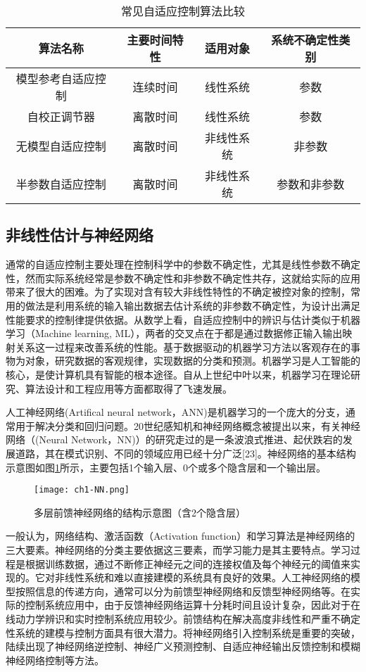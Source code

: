 \begin{table}
\centering
\caption{常见自适应控制算法比较}\label{tab:adaptive}
\begin{tabular*}{0.9\textwidth}{@{\extracolsep{\fill}}cccc}
\toprule
算法名称		&主要时间特性	&适用对象	&系统不确定性类别 \\
\midrule
模型参考自适应控制		&连续时间	&线性系统&参数\\
自校正调节器		&离散时间	& 线性系统&参数\\
无模型自适应控制		&离散时间	&非线性系统&非参数\\
半参数自适应控制		&离散时间&非线性系统	&参数和非参数\\
\bottomrule
\end{tabular*}
\end{table}

\subsection{非线性估计与神经网络}%

通常的自适应控制主要处理在控制科学中的参数不确定性，尤其是线性参数不确定性，然而实际系统经常是参数不确定性和非参数不确定性共存，这就给实际的应用带来了很大的困难。为了实现对含有较大非线性特性的不确定被控对象的控制，常用的做法是利用系统的输入输出数据去估计系统的非参数不确定性，为设计出满足性能要求的控制律提供依据。从数学上看，自适应控制中的辨识与估计类似于机器学习（Machine learning, ML），两者的交叉点在于都是通过数据修正输入输出映射关系这一过程来改善系统的性能。基于数据驱动的机器学习方法以客观存在的事物为对象，研究数据的客观规律，实现数据的分类和预测。机器学习是人工智能的核心，是使计算机具有智能的根本途径。自从上世纪中叶以来，机器学习在理论研究、算法设计和工程应用等方面都取得了飞速发展。

人工神经网络(Artifical neural network，ANN)是机器学习的一个庞大的分支，通常用于解决分类和回归问题。20世纪感知机和神经网络概念被提出以来，有关神经网络（(Neural Network，NN)）的研究走过的是一条波浪式推进、起伏跌宕的发展道路，其在模式识别、不同的领域应用已经十分广泛[23]。神经网络的基本结构示意图如图\ref{fig:MNN}所示，主要包括1个输入层、0个或多个隐含层和一个输出层。

\begin{figure}
 \centering
 \texttt{[image: ch1-NN.png]}
 \caption{多层前馈神经网络的结构示意图（含2个隐含层）}\label{fig:MNN}
\end{figure}

一般认为，网络结构、激活函数（Activation function）和学习算法是神经网络的三大要素。神经网络的分类主要依据这三要素，而学习能力是其主要特点。学习过程是根据训练数据，通过不断修正神经元之间的连接权值及每个神经元的阈值来实现的。它对非线性系统和难以直接建模的系统具有良好的效果。人工神经网络的模型按照信息的传递方向，通常可以分为前馈型神经网络和反馈型神经网络等。在实际的控制系统应用中，由于反馈神经网络运算十分耗时间且设计复杂，因此对于在线动力学辨识和实时控制系统应用较少。前馈结构在解决高度非线性和严重不确定性系统的建模与控制方面具有很大潜力。将神经网络引入控制系统是重要的突破，陆续出现了神经网络逆控制、神经广义预测控制、自适应神经输出反馈控制和模糊神经网络控制等方法。

